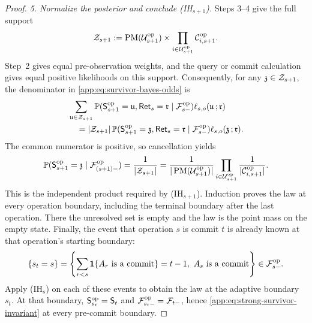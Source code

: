 \begin{proof}
\emph{5. Normalize the posterior and conclude (IH\(_{s+1}\)).}
Steps 3--4 give the full support
\[
 \mathcal Z_{s+1}:=
 \operatorname{PM}(\mathcal U^{\mathrm{op}}_{s+1})
 \times\prod_{i\in\mathcal U^{\mathrm{op}}_{s+1}}
                 \mathcal C^{\mathrm{op}}_{i,s+1}.
\]
Step~2 gives equal pre-observation weights, and the query or commit
calculation gives equal positive likelihoods on this support.
Consequently, for any \(\mathfrak z\in\mathcal Z_{s+1}\), the
denominator in \eqref{app:eq:survivor-bayes-odds} is
\begin{align*}
 &\sum_{\mathfrak u\in\mathcal Z_{s+1}}
  \mathbb P(\mathsf S^{\mathrm{op}}_{s+1}=\mathfrak u,
       \mathsf{Ret}_{s}=\mathfrak r\mid\mathcal F^{\mathrm{op}}_{s-})
       \ell_{s,o}(\mathfrak u\,;\mathfrak r)\\
 &\quad=|\mathcal Z_{s+1}|\,
  \mathbb P(\mathsf S^{\mathrm{op}}_{s+1}=\mathfrak z,
       \mathsf{Ret}_{s}=\mathfrak r\mid\mathcal F^{\mathrm{op}}_{s-})
       \ell_{s,o}(\mathfrak z\,;\mathfrak r).
\end{align*}
The common numerator is positive, so cancellation yields
\[
 \mathbb P(\mathsf S^{\mathrm{op}}_{s+1}=\mathfrak z
                 \mid\mathcal F^{\mathrm{op}}_{(s+1)-})
 =\frac1{|\mathcal Z_{s+1}|}
 =\frac1{|\operatorname{PM}(\mathcal U^{\mathrm{op}}_{s+1})|}
     \prod_{i\in\mathcal U^{\mathrm{op}}_{s+1}}
       \frac1{|\mathcal C^{\mathrm{op}}_{i,s+1}|}.
\]
This is the independent product required by (IH\(_{s+1}\)).
Induction proves the law at every operation boundary, including the
terminal boundary after the last operation.  There the unresolved set is
empty and the law is the point mass on the empty state.
Finally, the event that operation \(s\) is commit \(t\) is already known
at that operation's starting boundary:
\[
 \{s_t=s\}
 =\left\{\sum_{r<s}\mathbf 1\{A_r\text{ is a commit}\}=t-1,
             \ A_s\text{ is a commit}\right\}
 \in\mathcal F^{\mathrm{op}}_{s-}.
\]
Apply (IH\(_s\)) on each of these events to obtain the law at the
adaptive boundary \(s_t\).  At that boundary,
\(\mathsf S^{\mathrm{op}}_{s_t}=\mathsf S_{t}\) and
\(\mathcal F^{\mathrm{op}}_{s_t-}=\mathcal F_{t-}\), hence
\eqref{app:eq:strong-survivor-invariant} at every pre-commit boundary.
\end{proof}
\fi



